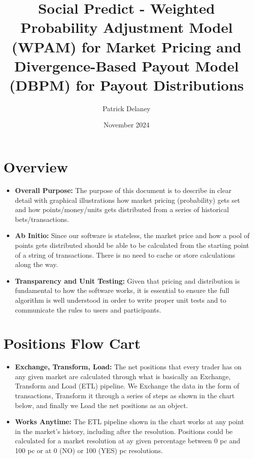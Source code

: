 \documentclass{article}
\title{Social Predict - Weighted Probability Adjustment Model (WPAM) for Market Pricing and Divergence-Based Payout Model (DBPM) for Payout Distributions}
\author{Patrick Delaney}
\date{November 2024}
\begin{document}
\maketitle

\section{Overview}

\begin{itemize}
    \item \textbf{Overall Purpose:} The purpose of this document is to describe in clear detail with graphical illustrations how market pricing (probability) gets set and how points/money/units gets distributed from a series of historical bets/transactions.
    \item \textbf{Ab Initio:} Since our software is stateless, the market price and how a pool of points gets distributed should be able to be calculated from the starting point of a string of transactions. There is no need to cache or store calculations along the way.
    \item \textbf{Transparency and Unit Testing:} Given that pricing and distribution is fundamental to how the software works, it is essential to ensure the full algorithm is well understood in order to write proper unit tests and to communicate the rules to users and participants.
\end{itemize}

\section{Positions Flow Cart}

\begin{itemize}
    \item \textbf{Exchange, Transform, Load:} The net positions that every trader has on any given market are calculated through what is basically an Exchange, Transform and Load (ETL) pipeline. We Exchange the data in the form of transactions, Transform it through a series of steps as shown in the chart below, and finally we Load the net positions as an object.
    \item \textbf{Works Anytime:} The ETL pipeline shown in the chart works at any point in the market's history, including after the resolution. Positions could be calculated for a market resolution at ay given percentage between 0 pc and 100 pc or at 0 (NO) or 100 (YES) pc resolutions.
\end{itemize}
\end{document}
